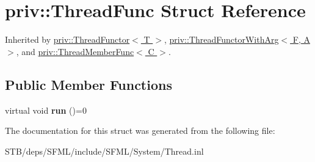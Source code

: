 \hypertarget{structpriv_1_1_thread_func}{\section{priv\+:\+:Thread\+Func Struct Reference}
\label{structpriv_1_1_thread_func}
}


Inherited by \hyperlink{structpriv_1_1_thread_functor}{priv\+::\+Thread\+Functor$<$ T $>$}, \hyperlink{structpriv_1_1_thread_functor_with_arg}{priv\+::\+Thread\+Functor\+With\+Arg$<$ F, A $>$}, and \hyperlink{structpriv_1_1_thread_member_func}{priv\+::\+Thread\+Member\+Func$<$ C $>$}.

\subsection*{Public Member Functions}
\begin{DoxyCompactItemize}
\item 
\hypertarget{structpriv_1_1_thread_func_ab5465e714ca4aa92a09bf5e24410a5c3}{virtual void {\bfseries run} ()=0}\label{structpriv_1_1_thread_func_ab5465e714ca4aa92a09bf5e24410a5c3}

\end{DoxyCompactItemize}


The documentation for this struct was generated from the following file\+:\begin{DoxyCompactItemize}
\item 
S\+T\+B/deps/\+S\+F\+M\+L/include/\+S\+F\+M\+L/\+System/Thread.\+inl\end{DoxyCompactItemize}
